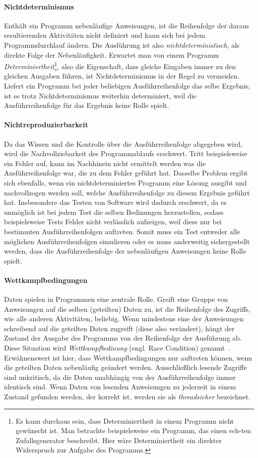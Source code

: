 \documentclass[12pt,a4paper,listof=totocnumbered,parskip=half]{scrreprt}
\begin{document}
\paragraph{Nichtdeterminismus}
Enthält ein Programm nebenläufige Anweisungen, ist die Reihenfolge der daraus resultierenden Aktivitäten nicht definiert und kann sich bei jedem Programmdurchlauf ändern. Die Ausführung ist also \emph{nichtdeterministisch}, als direkte Folge der Nebenläufigkeit. Erwartet man von einem Programm \emph{Determiniertheit}\footnote{Es kann durchaus sein, dass Determiniertheit in einem Programm nicht gewünscht ist. Man betrachte beispielsweise ein Programm, das einen ech-ten Zufallsgenerator beschreibt. Hier wäre Determiniertheit ein direkter Widerspruch zur Aufgabe des Programms.}, also die Eigenschaft, dass gleiche Eingaben immer zu den gleichen Ausgaben führen, ist Nichtdeterminismus in der Regel zu vermeiden. Liefert ein Programm bei jeder beliebigen Ausführreihenfolge das selbe Ergebnis, ist es trotz Nichtdeterminismus weiterhin determiniert, weil die Ausführreihenfolge für das Ergebnis keine Rolle spielt. 
\paragraph{Nichtreproduzierbarkeit}
Da das Wissen und die Kontrolle über die Ausführreihenfolge abgegeben wird, wird die Nachvollziebarkeit des Programmablaufs erschwert. Tritt beispielsweise ein Fehler auf, kann im Nachhinein nicht ermittelt werden was die Ausführreihenfolge war, die zu dem Fehler geführt hat. Dasselbe Problem ergibt sich ebenfalls, wenn ein nichtdeterminiertes Programm eine Lösung ausgibt und nachvollzogen werden soll, welche Ausführreihenfolge zu diesem Ergebnis geführt hat. Insbesondere das Testen von Software wird dadurch erschwert, da es unmöglich ist bei jedem Test die selben Bedinungen herzustellen, sodass beispielsweise Tests Fehler nicht verlässlich aufzeigen, weil diese nur bei bestimmten Ausführreihenfolgen auftreten. Somit muss ein Test entweder alle möglichen Ausführreihenfolgen simulieren oder es muss anderweitig sichergestellt werden, dass die Ausführreihenfolge der nebenläufigen Anweisungen keine Rolle spielt.
\paragraph{Wettkampfbedingungen}
Daten spielen in Programmen eine zentrale Rolle. Greift eine Gruppe von Anweisungen auf die selben (geteilten) Daten zu, ist die Reihenfolge des Zugriffs, wie alle anderen Aktivitäten, beliebig. Wenn mindestens eine der Anweisungen schreibend auf die geteilten Daten zugreift (diese also verändert), hängt der Zustand der Ausgabe des Programms von der Reihenfolge der Ausführung ab. Diese Situation wird \emph{Wettkampfbedinung} (engl. Race Condition) genannt~\cite{Hettel2016}. Erwähnenswert ist hier, dass Wettkampfbedingungen nur auftreten können, wenn die geteilten Daten nebenläufig geändert werden. Ausschließlich lesende Zugriffe sind unkritisch, da die Daten unabhängig von der Ausführreihenfolge immer identisch sind. Wenn Daten von lesenden Anweisungen zu jederzeit in einem Zustand gefunden werden, der korrekt ist, werden sie als \emph{threadsicher} bezeichnet. 
\end{document}
